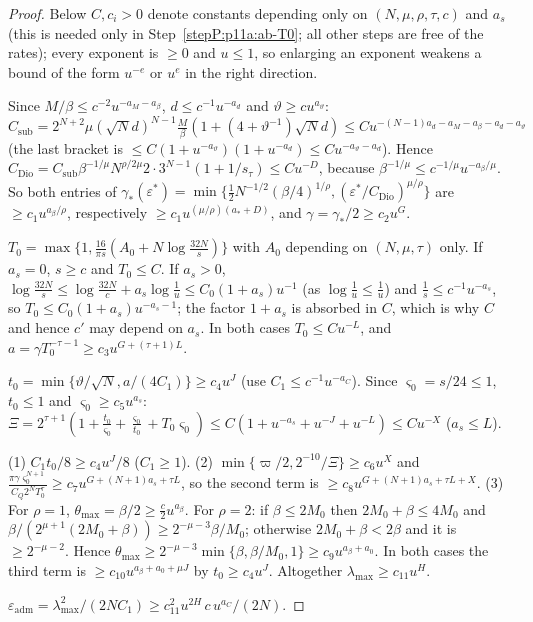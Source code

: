 \begin{proof}
Below $C,c_i>0$ denote constants depending only on $(N,\mu,\rho,\tau,c)$ and $a_s$ (this is needed only in Step~\ref{stepP:p11a:ab-T0}; all other steps are free of the rates); every exponent is $\ge0$ and $u\le1$, so enlarging an exponent weakens a bound of the form $u^{-e}$ or $u^{e}$ in the right direction.

\label{stepP:p11a:ab-gamma} Since $M/\beta\le c^{-2}u^{-a_M-a_\beta}$, $d\le c^{-1}u^{-a_d}$ and $\vartheta\ge cu^{a_\vartheta}$: $C_{\mathrm{sub}}=2^{N+2}\mu(\sqrt Nd)^{N-1}\frac M\beta(1+(4+\vartheta^{-1})\sqrt Nd)\le Cu^{-(N-1)a_d-a_M-a_\beta-a_d-a_\vartheta}$ (the last bracket is $\le C(1+u^{-a_\vartheta})(1+u^{-a_d})\le Cu^{-a_\vartheta-a_d}$). Hence $C_{\mathrm{Dio}}=C_{\mathrm{sub}}\beta^{-1/\mu}N^{\rho/2\mu}2\cdot3^{N-1}(1+1/s_\tau)\le Cu^{-D}$, because $\beta^{-1/\mu}\le c^{-1/\mu}u^{-a_\beta/\mu}$. So both entries of $\gamma_*(\varepsilon^*)=\min\{\frac12N^{-1/2}(\beta/4)^{1/\rho},(\varepsilon^*/C_{\mathrm{Dio}})^{\mu/\rho}\}$ are $\ge c_1u^{a_\beta/\rho}$, respectively $\ge c_1u^{(\mu/\rho)(a_*+D)}$, and $\gamma=\gamma_*/2\ge c_2u^{G}$.

\label{stepP:p11a:ab-T0} $T_0=\max\{1,\frac{16}{\pi s}(A_0+N\log\frac{32N}s)\}$ with $A_0$ depending on $(N,\mu,\tau)$ only. If $a_s=0$, $s\ge c$ and $T_0\le C$. If $a_s>0$, $\log\frac{32N}s\le\log\frac{32N}c+a_s\log\frac1u\le C_0(1+a_s)u^{-1}$ (as $\log\frac1u\le\frac1u$) and $\frac1s\le c^{-1}u^{-a_s}$, so $T_0\le C_0(1+a_s)u^{-a_s-1}$; the factor $1+a_s$ is absorbed in $C$, which is why $C$ and hence $c'$ may depend on $a_s$. In both cases $T_0\le Cu^{-L}$, and $a=\gamma T_0^{-\tau-1}\ge c_3u^{G+(\tau+1)L}$.

\label{stepP:p11a:ab-t0} $t_0=\min\{\vartheta/\sqrt N,a/(4C_1)\}\ge c_4u^{J}$ (use $C_1\le c^{-1}u^{-a_C}$). Since $\varsigma_0=s/24\le1$, $t_0\le1$ and $\varsigma_0\ge c_5u^{a_s}$: $\Xi=2^{\tau+1}(1+\frac{t_0}{\varsigma_0}+\frac{\varsigma_0}{t_0}+T_0\varsigma_0)\le C(1+u^{-a_s}+u^{-J}+u^{-L})\le Cu^{-X}$ ($a_s\le L$).

\label{stepP:p11a:ab-lam} (1) $C_1t_0/8\ge c_4u^J/8$ ($C_1\ge1$). (2) $\min\{\varpi/2,2^{-10}/\Xi\}\ge c_6u^{X}$ and $\frac{\pi\gamma\varsigma_0^{N+1}}{C_Q2^NT_0^\tau}\ge c_7u^{G+(N+1)a_s+\tau L}$, so the second term is $\ge c_8u^{G+(N+1)a_s+\tau L+X}$. (3) For $\rho=1$, $\theta_{\max}=\beta/2\ge\frac c2u^{a_\beta}$. For $\rho=2$: if $\beta\le2M_0$ then $2M_0+\beta\le4M_0$ and $\beta/(2^{\mu+1}(2M_0+\beta))\ge2^{-\mu-3}\beta/M_0$; otherwise $2M_0+\beta<2\beta$ and it is $\ge2^{-\mu-2}$. Hence $\theta_{\max}\ge2^{-\mu-3}\min\{\beta,\beta/M_0,1\}\ge c_9u^{a_\beta+a_0}$. In both cases the third term is $\ge c_{10}u^{a_\beta+a_0+\mu J}$ by $t_0\ge c_4u^J$. Altogether $\lambda_{\max}\ge c_{11}u^{H}$.

\label{stepP:p11a:ab-concl} $\varepsilon_{\mathrm{adm}}=\lambda_{\max}^2/(2NC_1)\ge c_{11}^2u^{2H}\,c\,u^{a_C}/(2N)$.
\end{proof}

